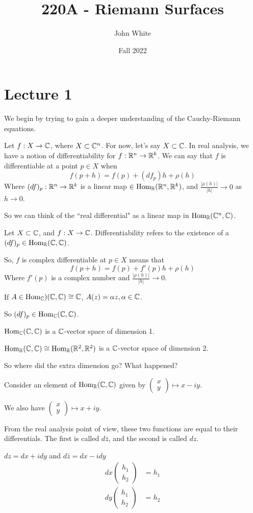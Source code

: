 \documentclass[x11names,reqno,14pt]{extarticle}
\title{220A - Riemann Surfaces}
\author{John White}
\date{Fall 2022}
\begin{document}
\section*{Lecture 1}

We begin by trying to gain a deeper understanding of the Cauchy-Riemann equations. 

Let $f:X\to \mathbb{C}$, where $X \subset \mathbb{C}^n$. For now, let's say $X \subset \mathbb{C}$. In real analysis, we have a notion of differentiability for $f:\mathbb{R}^n\to\mathbb{R}^k$. We can say that $f$ is differentiable at a point $p \in X$ when
\[
f(p + h) = f(p) + (df_p)h + \rho(h)
\]
Where $(df)_p:\mathbb{R}^n\to\mathbb{R}^k$ is a linear map $\in {\mathrm{Hom}}_{\mathbb{R}}(\mathbb{R}^n,\mathbb{R}^k)$, and $\frac{|\rho(h)|}{|h|} \to 0$ as $h \to 0$. 

So we can think of the ``real differential" as a linear map in ${\mathrm{Hom}}_{\mathbb{R}}(\mathbb{C}^n,\mathbb{C})$. 


Let $X \subset \mathbb{C}$, and $f:X\to\mathbb{C}$. Differentiability refers to the existence of a $(df)_p \in {\mathrm{Hom}}_{\mathbb{R}}(\mathbb{C},\mathbb{C})$. 

So, $f$ is complex differentiable at $p \in X$ means that 
\[
f(p + h) = f(p) + f'(p)h + \rho(h)
\]
Where $f'(p)$ is a complex number and $\frac{|\rho(h)|}{|h|}\to 0$. 

If $A \in {\mathrm{Hom}}_{\mathbb{C}})(\mathbb{C},\mathbb{C}) \cong \mathbb{C}$, $A(z) = \alpha z, \alpha \in \mathbb{C}$. 

So $(df)_p \in {\mathrm{Hom}}_{\mathbb{C}}(\mathbb{C},\mathbb{C})$.

${\mathrm{Hom}}_{\mathbb{C}}(\mathbb{C},\mathbb{C})$ is a $\mathbb{C}$-vector space of dimension 1. 

${\mathrm{Hom}}_{\mathbb{R}}(\mathbb{C}, \mathbb{C}) \cong {\mathrm{Hom}}_{\mathbb{R}}(\mathbb{R}^2,\mathbb{R}^2)$ is a $\mathbb{C}$-vector space of dimension 2. 

So where did the extra dimension go? What happened? 

Consider an element of ${\mathrm{Hom}}_{\mathbb{R}}(\mathbb{C},\mathbb{C})$ given by $\begin{pmatrix} x \\ y \end{pmatrix} \mapsto x - iy$. 

We also have $\begin{pmatrix} x \\ y \end{pmatrix} \mapsto x + iy$. 

From the real analysis point of view, these two functions are equal to their differentials. The first is called $d\bar{z}$, and the second is called $dz$.

$dz = dx + idy$ and
$d\bar{z} = dx - idy$
\begin{align*}
dx\begin{pmatrix} h_1 \\ h_2 \end{pmatrix} & = h_1 \\
dy\begin{pmatrix} h_1 \\ h_2 \end{pmatrix} & = h_2 \\
\end{align*}
\end{document}
